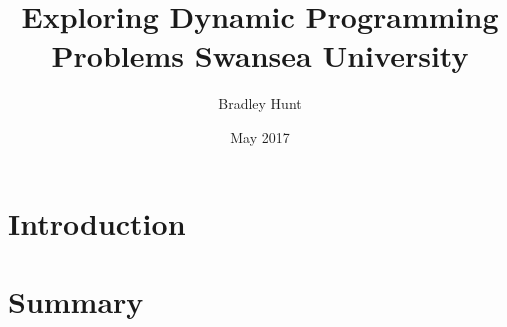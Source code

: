 \documentclass[12pt]{report}
\title{
	{Exploring Dynamic Programming Problems}
	{\large Swansea University}\\
}
\author{Bradley Hunt}
\date{May 2017}
\begin{document}
\maketitle

\tableofcontents

\chapter{Introduction}



\chapter{Summary}

\end{document}
